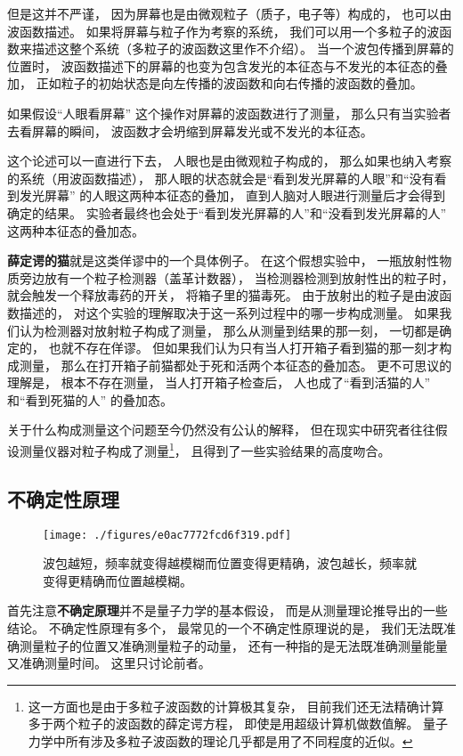 但是这并不严谨， 因为屏幕也是由微观粒子（质子，电子等）构成的， 也可以由波函数描述。 如果将屏幕与粒子作为考察的系统， 我们可以用一个多粒子的波函数来描述这整个系统（多粒子的波函数这里作不介绍）。 当一个波包传播到屏幕的位置时， 波函数描述下的屏幕的也变为包含发光的本征态与不发光的本征态的叠加， 正如粒子的初始状态是向左传播的波函数和向右传播的波函数的叠加。 

如果假设“人眼看屏幕” 这个操作对屏幕的波函数进行了测量， 那么只有当实验者去看屏幕的瞬间， 波函数才会坍缩到屏幕发光或不发光的本征态。

这个论述可以一直进行下去， 人眼也是由微观粒子构成的， 那么如果也纳入考察的系统（用波函数描述）， 那人眼的状态就会是“看到发光屏幕的人眼”和“没有看到发光屏幕” 的人眼这两种本征态的叠加， 直到人脑对人眼进行测量后才会得到确定的结果。 实验者最终也会处于“看到发光屏幕的人”和“没看到发光屏幕的人” 这两种本征态的叠加态。

\textbf{薛定谔的猫}就是这类佯谬中的一个具体例子。 在这个假想实验中， 一瓶放射性物质旁边放有一个粒子检测器（盖革计数器）， 当检测器检测到放射性出的粒子时， 就会触发一个释放毒药的开关， 将箱子里的猫毒死。 由于放射出的粒子是由波函数描述的， 对这个实验的理解取决于这一系列过程中的哪一步构成测量。 如果我们认为检测器对放射粒子构成了测量， 那么从测量到结果的那一刻， 一切都是确定的， 也就不存在佯谬。 但如果我们认为只有当人打开箱子看到猫的那一刻才构成测量， 那么在打开箱子前猫都处于死和活两个本征态的叠加态。 更不可思议的理解是， 根本不存在测量， 当人打开箱子检查后， 人也成了“看到活猫的人” 和“看到死猫的人” 的叠加态。

关于什么构成测量这个问题至今仍然没有公认的解释， 但在现实中研究者往往假设测量仪器对粒子构成了测量\footnote{这一方面也是由于多粒子波函数的计算极其复杂， 目前我们还无法精确计算多于两个粒子的波函数的薛定谔方程， 即使是用超级计算机做数值解。 量子力学中所有涉及多粒子波函数的理论几乎都是用了不同程度的近似。}， 且得到了一些实验结果的高度吻合。

\subsection{不确定性原理}

\begin{figure}[ht]
\centering
\texttt{[image: ./figures/e0ac7772fcd6f319.pdf]}
\caption{波包越短，频率就变得越模糊而位置变得更精确，波包越长，频率就变得更精确而位置越模糊。} \label{fig_QM0_5}
\end{figure}

首先注意\textbf{不确定原理}并不是量子力学的基本假设， 而是从测量理论推导出的一些结论。 不确定性原理有多个， 最常见的一个不确定性原理说的是， 我们无法既准确测量粒子的位置又准确测量粒子的动量， 还有一种指的是无法既准确测量能量又准确测量时间。 这里只讨论前者。

